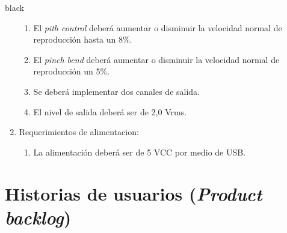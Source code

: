 \documentclass[11pt]{charter}
\begin{document}
\begin{consigna}{black}
\begin{enumerate}
\begin{enumerate}
	\item El \textit{pith control} deberá aumentar o disminuir la velocidad normal de reproducción hasta un 8\%.
	\item El \textit{pinch bend} deberá aumentar o disminuir la velocidad normal de reproducción un 5\%.
	\item Se deberá implementar dos canales de salida.
	\item El nivel de salida deberá ser de 2,0 Vrms.
	\end{enumerate}
\item Requerimientos de alimentacion:
	\begin{enumerate}
	\item La alimentación deberá ser de 5 VCC por medio de USB.
	\end{enumerate}
\end{enumerate}
\end{consigna}

\section{Historias de usuarios (\textit{Product backlog})}
\label{sec:backlog}
\end{document}
